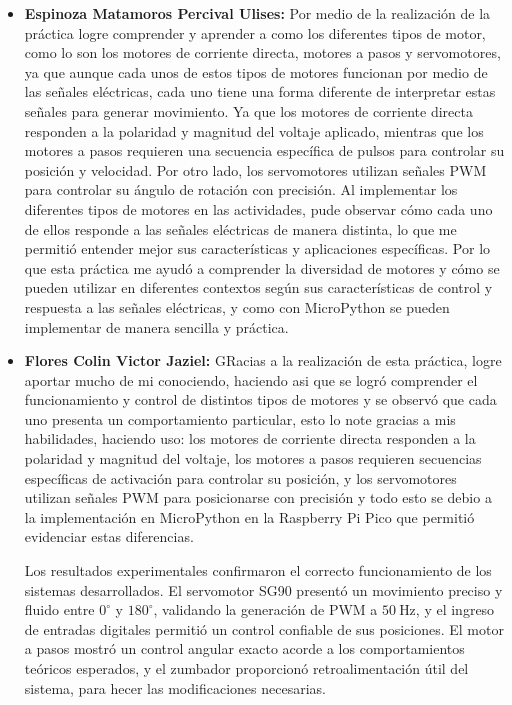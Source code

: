 \documentclass[letterpaper,12pt]{article}
\begin{document}
    \begin{itemize}
        \item \textbf{Espinoza Matamoros Percival Ulises:} Por medio de la realización de la práctica logre comprender y aprender a como los diferentes tipos de motor, como lo son los motores de corriente directa, motores a pasos y servomotores, ya que aunque cada unos de estos tipos de motores funcionan por medio de las señales eléctricas, cada uno tiene una forma diferente de interpretar estas señales para generar movimiento. Ya que los motores de corriente directa responden a la polaridad y magnitud del voltaje aplicado, mientras que los motores a pasos requieren una secuencia específica de pulsos para controlar su posición y velocidad. Por otro lado, los servomotores utilizan señales PWM para controlar su ángulo de rotación con precisión. Al implementar los diferentes tipos de motores en las actividades, pude observar cómo cada uno de ellos responde a las señales eléctricas de manera distinta, lo que me permitió entender mejor sus características y aplicaciones específicas. Por lo que esta práctica me ayudó a comprender la diversidad de motores y cómo se pueden utilizar en diferentes contextos según sus características de control y respuesta a las señales eléctricas, y como con MicroPython se pueden implementar de manera sencilla y práctica.

        \item \textbf{Flores Colin Victor Jaziel:}
        GRacias a la realización de esta práctica, logre aportar mucho de mi conociendo, haciendo  asi que se logró comprender el funcionamiento y control de distintos tipos de motores y se observó que cada uno presenta un comportamiento particular, esto lo note gracias a mis habilidades, haciendo uso: los motores de corriente directa responden a la polaridad y magnitud del voltaje, los motores a pasos requieren secuencias específicas de activación para controlar su posición, y los servomotores utilizan señales PWM para posicionarse con precisión y todo esto se debio a la implementación en MicroPython en la Raspberry Pi Pico que permitió evidenciar estas diferencias.
        
        Los resultados experimentales confirmaron el correcto funcionamiento de los sistemas desarrollados. El servomotor SG90 presentó un movimiento preciso y fluido entre $0^\circ$ y $180^\circ$, validando la generación de PWM a $50\ \text{Hz}$, y el ingreso de entradas digitales permitió un control confiable de sus posiciones. El motor a pasos mostró un control angular exacto acorde a los comportamientos teóricos esperados, y el zumbador proporcionó retroalimentación útil del sistema, para hecer las modificaciones necesarias.


\end{itemize}
\end{document}
